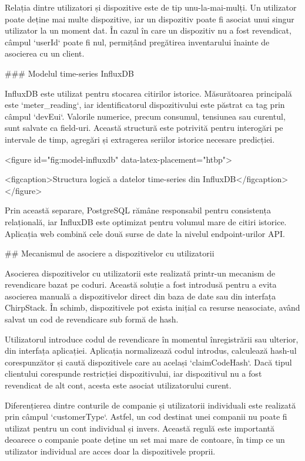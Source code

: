 Relația dintre utilizatori și dispozitive este de tip unu-la-mai-mulți.
Un utilizator poate deține mai multe dispozitive, iar un dispozitiv
poate fi asociat unui singur utilizator la un moment dat. În cazul în
care un dispozitiv nu a fost revendicat, câmpul `userId` poate fi nul,
permițând pregătirea inventarului înainte de asocierea cu un client.

### Modelul time-series InfluxDB

InfluxDB este utilizat pentru stocarea citirilor istorice. Măsurătoarea
principală este `meter_reading`, iar identificatorul dispozitivului este
păstrat ca tag prin câmpul `devEui`. Valorile numerice, precum consumul,
tensiunea sau curentul, sunt salvate ca field-uri. Această structură
este potrivită pentru interogări pe intervale de timp, agregări și
extragerea seriilor istorice necesare predicției.

<figure id="fig:model-influxdb" data-latex-placement="htbp">

<figcaption>Structura logică a datelor time-series din
InfluxDB</figcaption>
</figure>

Prin această separare, PostgreSQL rămâne responsabil pentru consistența
relațională, iar InfluxDB este optimizat pentru volumul mare de citiri
istorice. Aplicația web combină cele două surse de date la nivelul
endpoint-urilor API.

## Mecanismul de asociere a dispozitivelor cu utilizatorii

Asocierea dispozitivelor cu utilizatorii este realizată printr-un
mecanism de revendicare bazat pe coduri. Această soluție a fost
introdusă pentru a evita asocierea manuală a dispozitivelor direct din
baza de date sau din interfața ChirpStack. În schimb, dispozitivele pot
exista inițial ca resurse neasociate, având salvat un cod de revendicare
sub formă de hash.

Utilizatorul introduce codul de revendicare în momentul înregistrării
sau ulterior, din interfața aplicației. Aplicația normalizează codul
introdus, calculează hash-ul corespunzător și caută dispozitivele care
au același `claimCodeHash`. Dacă tipul clientului corespunde restricției
dispozitivului, iar dispozitivul nu a fost revendicat de alt cont,
acesta este asociat utilizatorului curent.

Diferențierea dintre conturile de companie și utilizatorii individuali
este realizată prin câmpul `customerType`. Astfel, un cod destinat unei
companii nu poate fi utilizat pentru un cont individual și invers.
Această regulă este importantă deoarece o companie poate deține un set
mai mare de contoare, în timp ce un utilizator individual are acces doar
la dispozitivele proprii.

